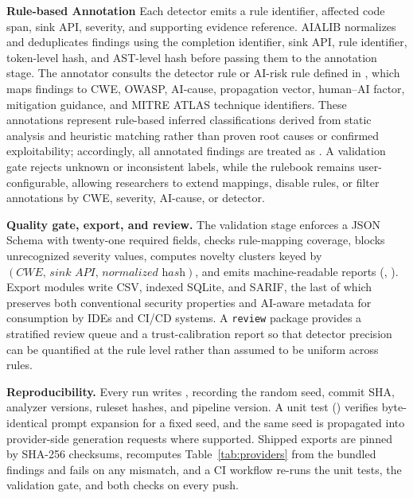 \documentclass[sigconf,review,anonymous=false]{acmart}
\begin{document}
\textbf{Rule-based Annotation} Each detector emits a rule identifier, affected code span, sink API, severity, and supporting evidence reference. AIALIB normalizes and deduplicates findings using the completion identifier, sink API, rule identifier, token-level hash, and AST-level hash before passing them to the annotation stage. The annotator consults the detector rule or AI-risk rule defined in , which maps findings to CWE, OWASP, AI-cause, propagation vector, human–AI factor, mitigation guidance, and MITRE ATLAS technique identifiers. These annotations represent rule-based inferred classifications derived from static analysis and heuristic matching rather than proven root causes or confirmed exploitability; accordingly, all annotated findings are treated as . A validation gate rejects unknown or inconsistent labels, while the rulebook remains user-configurable, allowing researchers to extend mappings, disable rules, or filter annotations by CWE, severity, AI-cause, or detector.

\textbf{Quality gate, export, and review.} The validation stage
enforces a JSON Schema with twenty-one required fields, checks
rule-mapping coverage, blocks unrecognized severity values, computes
novelty clusters keyed by $(\textit{CWE},\,\textit{sink API},\,\textit{normalized hash})$,
and emits machine-readable reports
(,
). Export modules write CSV,
indexed SQLite, and SARIF, the last of which preserves both
conventional security properties and AI-aware metadata for
consumption by IDEs and CI/CD systems. A \texttt{review} package
provides a stratified review queue and a trust-calibration report so
that detector precision can be quantified at the rule level rather
than assumed to be uniform across rules.

\textbf{Reproducibility.} Every run writes
, recording the random seed, commit
SHA, analyzer versions, ruleset hashes, and pipeline version. A unit
test ()
verifies byte-identical prompt expansion for a fixed seed, and the
same seed is propagated into provider-side generation requests where
supported. Shipped exports are pinned by SHA-256 checksums,
 recomputes
Table~\ref{tab:providers} from the bundled findings and fails on any
mismatch, and a CI workflow re-runs the unit tests, the validation
gate, and both checks on every push.
\end{document}
